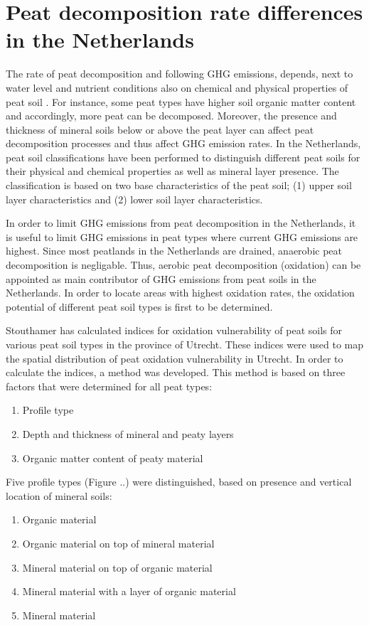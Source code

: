 {\section{Peat decomposition rate differences in the Netherlands}
The rate of peat decomposition and following GHG emissions, depends, next to water level and nutrient conditions also on chemical and physical properties of peat soil \citep{}. For instance, some peat types have higher soil organic matter content and accordingly, more peat can be decomposed. Moreover, the presence and thickness of mineral soils below or above the peat layer can affect peat decomposition processes and thus affect GHG emission rates. In the Netherlands, peat soil classifications have been performed to distinguish different peat soils for their physical and chemical properties as well as mineral layer presence. The classification is based on two base characteristics of the peat soil; (1) upper soil layer characteristics and (2) lower soil layer characteristics. 

In order to limit GHG emissions from peat decomposition in the Netherlands, it is useful to limit GHG emissions in peat types where current GHG emissions are highest. Since most peatlands in the Netherlands are drained, anaerobic peat decomposition is negligable. Thus, aerobic peat decomposition (oxidation) can be appointed as main contributor of GHG emissions from peat soils in the Netherlands. In order to locate areas with highest oxidation rates, the oxidation potential of different peat soil types is first to be determined.

Stouthamer has calculated indices for oxidation vulnerability of peat soils for various peat soil types in the province of Utrecht. These indices were used to map the spatial distribution of peat oxidation vulnerability in Utrecht. In order to calculate the indices, a method was developed. This method is based on three factors that were determined for all peat types: 

\begin{enumerate}
\item Profile type
\item Depth and thickness of mineral and peaty layers
\item Organic matter content of peaty material
\end{enumerate}

Five profile types (Figure ..) were distinguished, based on presence and vertical location of mineral soils:

\begin{enumerate}
\item Organic material
\item Organic material on top of mineral material
\item Mineral material on top of organic material
\item Mineral material with a layer of organic material
\item Mineral material


\end{enumerate}}
